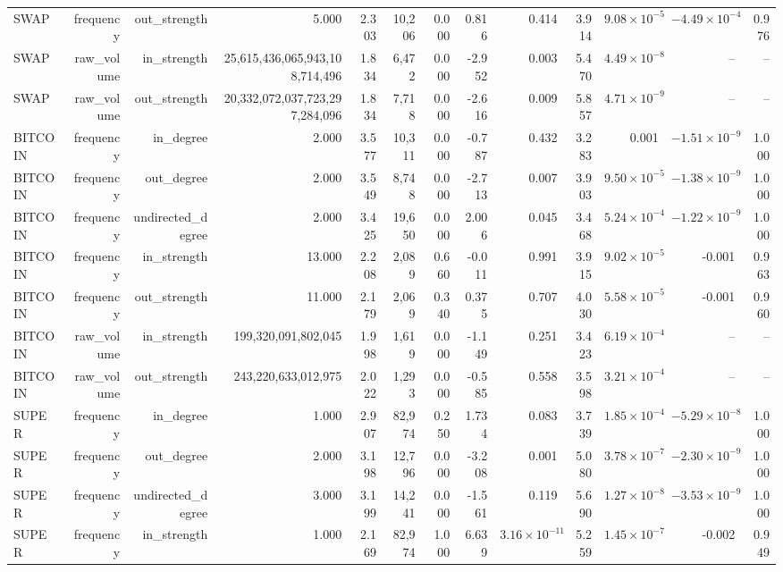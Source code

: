 \begin{table}[t]
\begin{tabular}{lrrrrrrrrrrrr}
SWAP & frequency & out\_strength & 5.000 & 2.303 & 10{,}206 & 0.000 & 0.816 & 0.414 & 3.914 & $9.08\times10^{-5}$ & $-4.49\times10^{-4}$ & 0.976 \\
SWAP & raw\_volume & in\_strength & 25{,}615{,}436{,}065{,}943{,}108{,}714{,}496 & 1.834 & 6{,}472 & 0.000 & -2.952 & 0.003 & 5.470 & $4.49\times10^{-8}$ & -- & -- \\
SWAP & raw\_volume & out\_strength & 20{,}332{,}072{,}037{,}723{,}297{,}284{,}096 & 1.834 & 7{,}718 & 0.000 & -2.616 & 0.009 & 5.857 & $4.71\times10^{-9}$ & -- & -- \\
BITCOIN & frequency & in\_degree & 2.000 & 3.577 & 10{,}311 & 0.000 & -0.787 & 0.432 & 3.283 & 0.001 & $-1.51\times10^{-9}$ & 1.000 \\
BITCOIN & frequency & out\_degree & 2.000 & 3.549 & 8{,}748 & 0.000 & -2.713 & 0.007 & 3.903 & $9.50\times10^{-5}$ & $-1.38\times10^{-9}$ & 1.000 \\
BITCOIN & frequency & undirected\_degree & 2.000 & 3.425 & 19{,}650 & 0.000 & 2.006 & 0.045 & 3.468 & $5.24\times10^{-4}$ & $-1.22\times10^{-9}$ & 1.000 \\
BITCOIN & frequency & in\_strength & 13.000 & 2.208 & 2{,}089 & 0.660 & -0.011 & 0.991 & 3.915 & $9.02\times10^{-5}$ & -0.001 & 0.963 \\
BITCOIN & frequency & out\_strength & 11.000 & 2.179 & 2{,}069 & 0.340 & 0.375 & 0.707 & 4.030 & $5.58\times10^{-5}$ & -0.001 & 0.960 \\
BITCOIN & raw\_volume & in\_strength & 199{,}320{,}091{,}802{,}045 & 1.998 & 1{,}619 & 0.000 & -1.149 & 0.251 & 3.423 & $6.19\times10^{-4}$ & -- & -- \\
BITCOIN & raw\_volume & out\_strength & 243{,}220{,}633{,}012{,}975 & 2.022 & 1{,}293 & 0.000 & -0.585 & 0.558 & 3.598 & $3.21\times10^{-4}$ & -- & -- \\
SUPER & frequency & in\_degree & 1.000 & 2.907 & 82{,}974 & 0.250 & 1.734 & 0.083 & 3.739 & $1.85\times10^{-4}$ & $-5.29\times10^{-8}$ & 1.000 \\
SUPER & frequency & out\_degree & 2.000 & 3.198 & 12{,}796 & 0.000 & -3.208 & 0.001 & 5.080 & $3.78\times10^{-7}$ & $-2.30\times10^{-9}$ & 1.000 \\
SUPER & frequency & undirected\_degree & 3.000 & 3.199 & 14{,}241 & 0.000 & -1.561 & 0.119 & 5.690 & $1.27\times10^{-8}$ & $-3.53\times10^{-9}$ & 1.000 \\
SUPER & frequency & in\_strength & 1.000 & 2.169 & 82{,}974 & 1.000 & 6.639 & $3.16\times10^{-11}$ & 5.259 & $1.45\times10^{-7}$ & -0.002 & 0.949 \\

\end{tabular}
\end{table}
